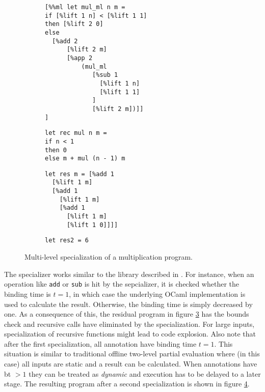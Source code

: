 \begin{figure}[H]
  \centering
  \begin{subfigure}[t]{0.49\textwidth}
\begin{verbatim}
[%%ml let mul_ml n m =
if [%lift 1 n] < [%lift 1 1]
then [%lift 2 0]
else
  [%add 2
      [%lift 2 m]
      [%app 2
          (mul_ml
             [%sub 1
               [%lift 1 n]
               [%lift 1 1]
             ]
             [%lift 2 m])]]
]
\end{verbatim}
    \label{fig:ml_mul}
  \end{subfigure}
  \begin{subfigure}[t]{0.49\textwidth}
\begin{verbatim}
let rec mul n m =
if n < 1
then 0
else m + mul (n - 1) m
\end{verbatim}
    \label{fig:mul}
  \end{subfigure}
  \begin{subfigure}[c]{0.49\textwidth}   
\begin{verbatim}
let res m = [%add 1
  [%lift 1 m]
  [%add 1
    [%lift 1 m]
    [%add 1
      [%lift 1 m]
      [%lift 1 0]]]]
\end{verbatim}
    \label{fig:mul_res}
  \end{subfigure}
  \begin{subfigure}{0.49\textwidth}
\begin{verbatim}
let res2 = 6
\end{verbatim}
    \label{fig:mul_final_res}
  \end{subfigure}
  \caption{Multi-level specialization of a multiplication program.}
  \label{lst:mul}
\end{figure}
The specializer works similar to the library described in \cite{multilevel}. For instance, when an operation like \texttt{add} or \texttt{sub} is hit by the sepcializer, it is checked whether the binding time is $t=1$, in which case the underlying OCaml implementation is used to calculate the result. Otherwise, the binding time is simply decreased by one. As a consequence of this, the residual program in figure \ref{fig:mul_res} has the bounds check and recursive calls have eliminated by the specialization. For large inputs, specialization of recursive functions might lead to code explosion. Also note that after the first specialization, all annotation have binding time $t=1$. This situation is similar to traditional offline two-level partial evaluation where (in this case) all inputs are static and a result can be calculated. When annotations have bt $> 1$ they can be treated as \textit{dynamic} and execution has to be delayed to a later stage. The resulting program after a second specialization is shown in figure \ref{fig:mul_final_res}.


